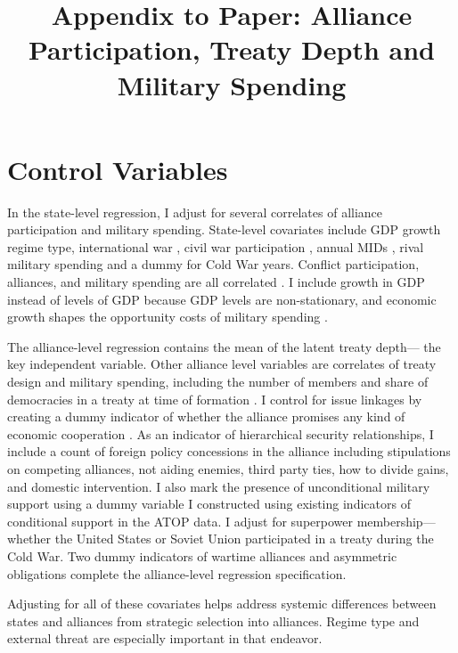 \documentclass[12pt]{article}
\title{\textbf{Appendix to Paper: Alliance Participation, Treaty Depth and Military Spending}}
\date{}
\begin{document}
\maketitle 

\doublespace 


\section{Control Variables}

In the state-level regression, I adjust for several correlates of alliance participation and military spending. 
State-level covariates include GDP growth \citep{Boltetal2018} regime type, international war \citep{Reiteretal2016}, civil war participation \citep{SarkeesWayman2010}, annual MIDs \citep{Gibleretal2016}, rival military spending \citep{ThompsonDreyer2012} and a dummy for Cold War years.
Conflict participation, alliances, and military spending are all correlated \citep{SeneseVasquez2008}.
I include growth in GDP instead of levels of GDP because GDP levels are non-stationary, and economic growth shapes the opportunity costs of military spending \citep{Kimball2010, Zielinskietal2017}.  


The alliance-level regression contains the mean of the latent treaty depth--- the key independent variable. 
Other alliance level variables are correlates of treaty design and military spending, including the number of members and share of democracies in a treaty at time of formation \citep{Chibaetal2015}. 
I control for issue linkages by creating a dummy indicator of whether the alliance promises any kind of economic cooperation \citep{Poast2013, LongLeeds2006}. 
As an indicator of hierarchical security relationships, I include a count of foreign policy concessions in the alliance including stipulations on competing alliances, not aiding enemies, third party ties, how to divide gains, and domestic intervention. 
I also mark the presence of unconditional military support using a dummy variable I constructed using existing indicators of conditional support in the ATOP data. 
I adjust for superpower membership--- whether the United States or Soviet Union participated in a treaty during the Cold War. 
Two dummy indicators of wartime alliances and asymmetric obligations \citep{Leedsetal2002} complete the alliance-level regression specification. 


Adjusting for all of these covariates helps address systemic differences between states and alliances from strategic selection into alliances. 
Regime type and external threat are especially important in that endeavor. 
\end{document}
